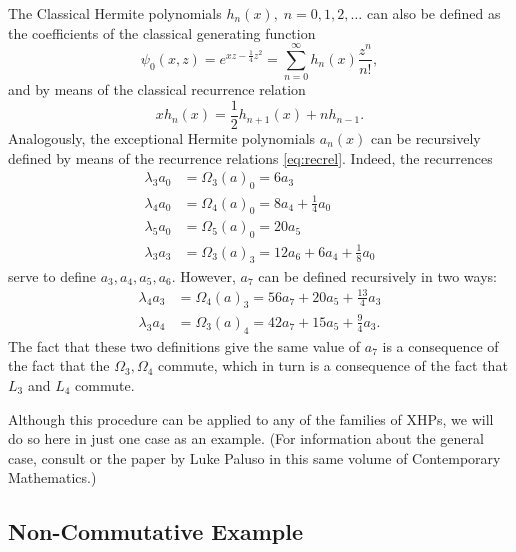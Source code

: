 \documentclass{amsart}
\theoremstyle{definition}
\theoremstyle{remark}
\numberwithin{equation}{section}
\def\S{\mathfrak{S}}
\begin{document}
The Classical Hermite polynomials $h_n(x),\; n=0,1,2,\ldots$ can also be
defined as the coefficients of the classical generating function
\[\psi_0(x,z) = e^{xz-\frac14 z^2} = \sum_{n=0}^\infty h_n(x)
  \frac{z^n}{n!},\]
and by means of the classical recurrence relation
\[ x h_n(x) = \frac12 h_{n+1}(x) + n h_{n-1}.\] Analogously, the
exceptional Hermite polynomials $a_n(x)$ can be recursively defined by
means of the recurrence relations \eqref{eq:recrel}.  Indeed,
the recurrences
\begin{align*}
  \lambda_3 a_0 &= \Omega_3(a)_0 = 6 a_3\\
  \lambda_4 a_0 & = \Omega_4(a)_0 = 8 a_4+ \frac14 a_0 \\
  \lambda_5 a_0 &= \Omega_5(a)_0 = 20 a_5\\
  \lambda_3 a_3 &= \Omega_3(a)_3 = 12 a_6+6 a_4 + \frac18 a_0
\end{align*}
serve to define $a_3,a_4,a_5,a_6$.  However, $a_7$ can be defined
recursively in two ways:
\begin{align*}
  \lambda_4 a_3 &= \Omega_4(a)_3 = 56 a_7+20 a_5 + \frac{13}4 a_3\\
  \lambda_3 a_4 &= \Omega_3(a)_4 = 42 a_7+15 a_5+\frac94 a_3.
\end{align*}
The fact that these two definitions give the same value of $a_7$ is a
consequence of the fact that the $\Omega_3,\Omega_4$ commute,
which in turn is a consequence of the fact that $L_3$ and $L_4$ commute.



Although this procedure can be applied to any of the families of XHPs, we will
do so here in just one case as an example.  (For information about the
general case, consult \cite{MilsonKasman2020} or the paper by Luke
Paluso in this same volume of Contemporary Mathematics.)


\subsection{Non-Commutative Example}\label{sec:examp3}

\end{document}
